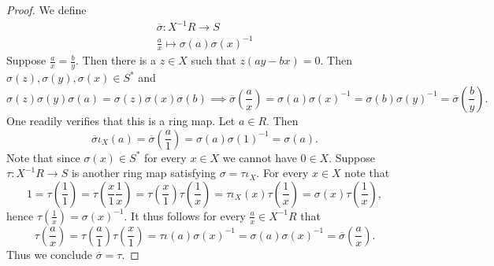     \begin{proof}
        We define 
        \begin{gather*}
            \overline{\sigma}:X^{-1}R\rightarrow S\\
            \frac{a}{x}\mapsto \sigma(a)\sigma(x)^{-1}
        \end{gather*}
        Suppose $\frac{a}{x}=\frac{b}{y}$. Then there is a $z\in X$ such that $z(ay-bx)=0$. Then $\sigma(z),\sigma(y),\sigma(x)\in S^\ast$ and 
        $$
            \sigma(z)\sigma(y)\sigma(a) = \sigma(z)\sigma(x)\sigma(b)\implies \overline{\sigma}\left(\frac{a}{x}\right)=\sigma(a)\sigma(x)^{-1}=\sigma(b)\sigma(y)^{-1}=\overline{\sigma}\left(\frac{b}{y}\right).
        $$ 
        One readily verifies that this is a ring map. Let $a\in R$. Then 
        $$
            \overline{\sigma}\iota_X(a)=\overline{\sigma}\left(\frac{a}{1}\right)=\sigma(a)\sigma(1)^{-1}=\sigma(a).
        $$
        Note that since $\sigma(x)\in S^\ast$ for every $x\in X$ we cannot have $0\in X$. Suppose $\tau: X^{-1}R\rightarrow S$ is another ring map satisfying $\sigma = \tau\iota_X$. For every $x\in X$ note that 
        $$
            1 = \tau\left(\frac{1}{1}\right) = \tau\left(\frac{x}{1}\frac{1}{x}\right)=\tau\left(\frac{x}{1}\right)\tau\left(\frac{1}{x}\right)=\tau\iota_X(x)\tau\left(\frac{1}{x}\right)=\sigma(x)\tau\left(\frac{1}{x}\right),
        $$
        hence $\tau\left(\frac{1}{x}\right)=\sigma(x)^{-1}$. It thus follows for every $\frac{a}{x}\in X^{-1}R$ that 
        $$
            \tau\left(\frac{a}{x}\right)=\tau\left(\frac{a}{1}\right)\tau\left(\frac{x}{1}\right)=\tau\iota(a)\sigma(x)^{-1}=\sigma(a)\sigma(x)^{-1}=\overline{\sigma}\left(\frac{a}{x}\right).
        $$ 
        Thus we conclude $\overline{\sigma}=\tau$.
    \end{proof}
